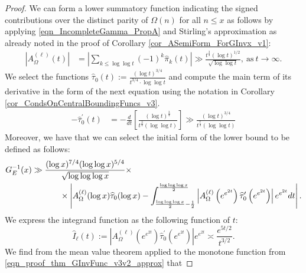 \documentclass[11pt,reqno,a4letter]{article}
\numberwithin{figure}{section}
\numberwithin{table}{section}
\theoremstyle{plain}
\numberwithin{theorem}{section}
\theoremstyle{definition}
\begin{document}
\begin{proof} 
We can form a lower summatory function indicating the signed contributions over the distinct 
parity of $\Omega(n)$ for all $n \leq x$ as follows by applying 
\eqref{eqn_IncompleteGamma_PropA} and Stirling's approximation as already noted in the 
proof of Corollary \ref{cor_ASemiForm_ForGInvx_v1}: 
\begin{align} 
\label{proof_thm_GInvFunc_v0} 
\left\lvert A_{\Omega}^{(\ell)}(t) \right\rvert & = 
     \left\lvert \sum_{k \leq \log\log t} (-1)^k \widehat{\pi}_k(t) \right\rvert 
     \gg 
     \frac{t^{\frac{3}{4}} (\log t)^{1/2}}{\sqrt{\log\log t}}, 
     \mathrm{\ as\ } t \rightarrow \infty. 
\end{align} 
We select the functions 
$\widehat{\tau}_0(t) := \frac{(\log t)^{3/4}}{t^{3/4} \cdot \log\log t}$ and 
compute the main term of its derivative 
in the form of the next equation using 
the notation in Corollary \ref{cor_CondsOnCentralBoundingFuncs_v3}. 
\begin{align} 
\label{eqn_HatTauPrimet_summation_weight_func_exp_v2} 
-\widehat{\tau}_0^{\prime}(t) & = -\frac{d}{dt}\left[ 
     \frac{(\log t)^{\frac{3}{4}}}{t^{\frac{3}{4}} (\log\log t)} 
     \right] \gg \frac{(\log t)^{3/4}}{t^{\frac{7}{4}} (\log\log t)} 
\end{align} 
Moreover, we have that we can select 
the initial form of the lower bound to be defined as follows: 
\begin{align} 
\label{proof_thm_GInvFunc_v1} 
G_{E}^{-1}(x) & \gg 
     \frac{(\log x)^{7/4} (\log\log x)^{5/4}}{\sqrt{\log\log\log x}} \times \\ 
\notag 
     & \phantom{:=\qquad\ } \times 
     \left\lvert A_{\Omega}^{(\ell)}(\log x) \widehat{\tau}_0(\log x) - 
     \int_{\frac{\log\log\log x}{2}-\frac{1}{2}}^{\frac{\log\log\log x}{2}} 
     \left\lvert 
     A_{\Omega}^{(\ell)}\left(e^{e^{2t}}\right) \widehat{\tau}_0^{\prime}\left(e^{e^{2t}}\right) 
     \right\rvert e^{e^{2t}} dt 
     \right\rvert. 
\end{align} 
We express the integrand function as the following function of $t$: 
\begin{equation} 
\label{eqn_proof_thm_GInvFunc_v3v2_approx} 
\widehat{I}_{\ell}(t) := \left\lvert 
     A_{\Omega}^{(\ell)}\left(e^{e^{2t}}\right) \widehat{\tau}_0^{\prime}\left(e^{e^{2t}}\right) 
     \right\rvert e^{e^{2t}} \asymp \frac{e^{5t/2}}{t^{3/2}}. 
\end{equation} 
We find from the mean value theorem applied to the monotone function from 
\eqref{eqn_proof_thm_GInvFunc_v3v2_approx} that 

\end{proof}
\end{document}
